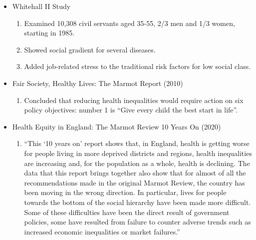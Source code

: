 \begin{itemize}
        \item Whitehall II Study
        \begin{enumerate}
            \item Examined 10,308 civil servants aged 35-55, 2/3 men and 1/3 women, starting in 1985.
            \item Showed social gradient for several diseases.
            \item Added job-related stress to the traditional risk factors for low social class.
        \end{enumerate}

        \item Fair Society, Healthy Lives: The Marmot Report (2010)
        \begin{enumerate}
            \item Concluded that reducing health inequalities would require action on six policy objectives: number 1 is “Give every child the best start in life”.
        \end{enumerate}

        \item Health Equity in England: The Marmot Review 10 Years On (2020)
        \begin{enumerate}
            \item “This ‘10 years on’ report shows that, in England, health is getting worse for people living in more deprived districts and regions, health inequalities are increasing  and, for the population as a whole, health is declining. The data that this report brings together also show that for almost of all the recommendations made in the original Marmot Review, the country has been moving in the wrong direction. In particular, lives for people towards the bottom of the social hierarchy have been made more difficult. Some of these difficulties have been the direct result of government policies, some have resulted from failure to counter adverse trends such as increased economic inequalities or market failures.”
        \end{enumerate}
\end{itemize} 

